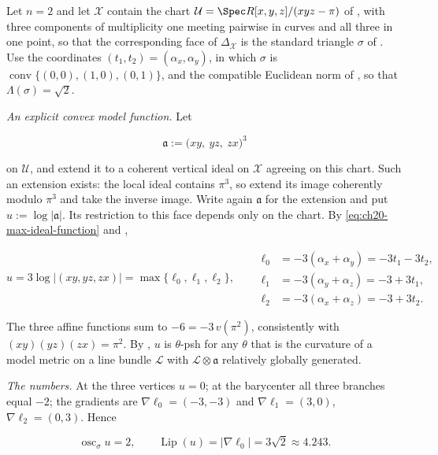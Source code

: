 \begin{example}
\label{ex:ch22-modulus-triangle}
Let $n=2$ and let $\mathcal X$ contain the chart
$\mathcal U=\Spec R[x,y,z]/(xyz-\pi)$ of
, with three components of multiplicity one
meeting pairwise in curves and all three in one point, so that the
corresponding face of $\Delta_{\mathcal X}$ is the standard triangle
$\sigma$ of .  Use the coordinates
$(t_1,t_2)=(\alpha_x,\alpha_y)$, in which $\sigma$ is
$\operatorname{conv}\{(0,0),(1,0),(0,1)\}$, and the compatible Euclidean
norm of , so that
$\Lambda(\sigma)=\sqrt2$.

\emph{An explicit convex model function.}  Let

\[
\mathfrak a:=\bigl(xy,\ yz,\ zx\bigr)^3
\]

on $\mathcal U$, and extend it to a coherent vertical ideal on
$\mathcal X$ agreeing on this chart.  Such an extension exists: the local
ideal contains $\pi^3$, so extend its image coherently modulo $\pi^3$
and take the inverse image.  Write again $\mathfrak a$ for the extension
and put $u:=\log|\mathfrak a|$.  Its restriction to this face depends only
on the chart.  By \eqref{eq:ch20-max-ideal-function} and
,

\[
 u=3\log|(xy,yz,zx)|=\max\{\ell_0,\ell_1,\ell_2\},
 \qquad
 \begin{aligned}
 \ell_0&=-3(\alpha_x+\alpha_y)=-3t_1-3t_2,\\
 \ell_1&=-3(\alpha_y+\alpha_z)=-3+3t_1,\\
 \ell_2&=-3(\alpha_x+\alpha_z)=-3+3t_2 .
 \end{aligned}
\tag{22.60}\label{eq:ch22-triangle-function}
\]

The three affine functions sum to $-6=-3\,v(\pi^2)$, consistently with
$(xy)(yz)(zx)=\pi^2$.  By
, $u$ is $\theta$-psh for any
$\theta$ that is the curvature of a model metric on a line bundle
$\mathcal L$ with $\mathcal L\otimes\mathfrak a$ relatively globally
generated.

\emph{The numbers.}  At the three vertices $u=0$; at the barycenter all
three branches equal $-2$; the gradients are
$\nabla\ell_0=(-3,-3)$ and $\nabla\ell_1=(3,0)$,
$\nabla\ell_2=(0,3)$.  Hence

\[
 \operatorname{osc}_\sigma u=2,
 \qquad
 \operatorname{Lip}(u)=|\nabla\ell_0|=3\sqrt2\approx4.243 .
\tag{22.61}\label{eq:ch22-triangle-numbers}
\]


\end{example}
